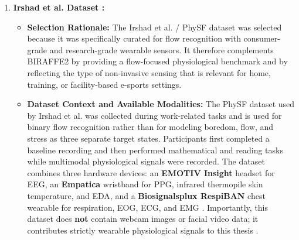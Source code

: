 \begin{enumerate}
\begin{itemize}
        \item \textbf{Ground Truth Strategy:} The primary ground truth is derived from the \textbf{GEQ Core Module} \autocite{ijsselsteijn2013game}, a standardized instrument for evaluating game experience across seven components. For flow-state labeling, this thesis uses the \textbf{Flow subscale}, which consists of five items:
        \begin{enumerate}
            \item Item 3: \enquote{I forgot everything around me.}
            \item Item 12: \enquote{I was fully occupied with the game.}
            \item Item 18: \enquote{I lost track of time.}
            \item Item 25: \enquote{I felt completely absorbed.}
            \item Item 33: \enquote{I was deeply concentrated in the game.}
        \end{enumerate}
        Each item is rated on a 5-point Likert scale (0 = \textit{not at all} to 4 = \textit{extremely}). The flow label is generated by calculating the mean score across these items. High-fidelity flow states are identified when this mean exceeds a defined threshold (e.g., $>3.0$), enabling a direct mapping between physiological patterns and the subjective dimensions of immersion, absorption, and concentration.
    \end{itemize}

    \item \textbf{Irshad et al. Dataset \autocite{irshad2023wearable}:}
    \begin{itemize}
        \item \textbf{Selection Rationale:} The Irshad et al. / PhySF dataset was selected because it was specifically curated for flow recognition with consumer-grade and research-grade wearable sensors. It therefore complements BIRAFFE2 by providing a flow-focused physiological benchmark and by reflecting the type of non-invasive sensing that is relevant for home, training, or facility-based e-sports settings.

        \item \textbf{Dataset Context and Available Modalities:} The PhySF dataset used by Irshad et al. was collected during work-related tasks and is used for binary flow recognition rather than for modeling boredom, flow, and stress as three separate target states. Participants first completed a baseline recording and then performed mathematical and reading tasks while multimodal physiological signals were recorded. The dataset combines three hardware devices: an \textbf{EMOTIV Insight} headset for EEG, an \textbf{Empatica} wristband for PPG, infrared thermopile skin temperature, and EDA, and a \textbf{Biosignalsplux RespiBAN} chest wearable for respiration, EOG, ECG, and EMG \autocite{irshad2023wearable}. Importantly, this dataset does \textbf{not} contain webcam images or facial video data; it contributes strictly wearable physiological signals to this thesis \autocite{irshad2023wearable}.
        

\end{itemize}
\end{enumerate}
